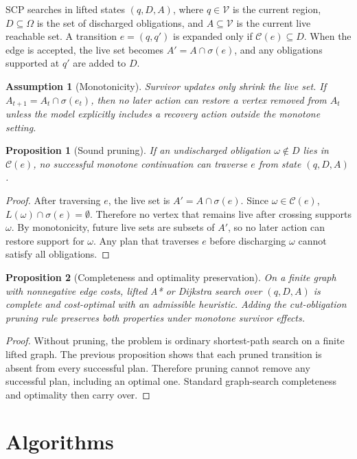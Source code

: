 \documentclass{article}
\newtheorem{proposition}{Proposition}
\newtheorem{assumption}{Assumption}
\newcommand{\vertices}{\mathcal{V}}
\newcommand{\obligations}{\Omega}
\newcommand{\cert}{\mathcal{C}}
\newcommand{\survive}{\sigma}
\begin{document}
SCP searches in lifted states $(q,D,A)$, where $q\in\vertices$ is the current region, $D\subseteq\obligations$ is the set of discharged obligations, and $A\subseteq\vertices$ is the current live reachable set. A transition $e=(q,q')$ is expanded only if $\cert(e)\subseteq D$. When the edge is accepted, the live set becomes $A'=A\cap\survive(e)$, and any obligations supported at $q'$ are added to $D$.

\begin{assumption}[Monotonicity]
Survivor updates only shrink the live set. If $A_{t+1}=A_t\cap\survive(e_t)$, then no later action can restore a vertex removed from $A_t$ unless the model explicitly includes a recovery action outside the monotone setting.
\end{assumption}

\begin{proposition}[Sound pruning]
If an undischarged obligation $\omega\notin D$ lies in $\cert(e)$, no successful monotone continuation can traverse $e$ from state $(q,D,A)$.
\end{proposition}
\begin{proof}
After traversing $e$, the live set is $A'=A\cap\survive(e)$. Since $\omega\in\cert(e)$, $L(\omega)\cap\survive(e)=\emptyset$. Therefore no vertex that remains live after crossing supports $\omega$. By monotonicity, future live sets are subsets of $A'$, so no later action can restore support for $\omega$. Any plan that traverses $e$ before discharging $\omega$ cannot satisfy all obligations.
\end{proof}

\begin{proposition}[Completeness and optimality preservation]
On a finite graph with nonnegative edge costs, lifted A* or Dijkstra search over $(q,D,A)$ is complete and cost-optimal with an admissible heuristic. Adding the cut-obligation pruning rule preserves both properties under monotone survivor effects.
\end{proposition}
\begin{proof}
Without pruning, the problem is ordinary shortest-path search on a finite lifted graph. The previous proposition shows that each pruned transition is absent from every successful plan. Therefore pruning cannot remove any successful plan, including an optimal one. Standard graph-search completeness and optimality then carry over.
\end{proof}

\section{Algorithms}
\end{document}
